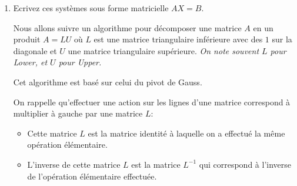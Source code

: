 \begin{enumerate}
    \item Ecrivez ces systèmes sous forme matricielle $A X = B$.


Nous allons suivre un algorithme pour décomposer une matrice $A$ en un produit $A = LU$ où $L$ est une matrice triangulaire inférieure avec des $1$ sur la diagonale et $U$ une matrice triangulaire supérieure.\newline 
\textit{On note souvent $L$ pour Lower, et $U$ pour Upper.}

Cet algorithme est basé sur celui du pivot de Gauss.

    \vspace{1em}
    On rappelle qu'effectuer une action sur les lignes d'une matrice correspond à multiplier à gauche par une matrice $L$: 
    \begin{itemize}
        \item Cette matrice $L$ est la matrice identité à laquelle on a effectué la même opération élémentaire.
        \item L'inverse de cette matrice $L$ est la matrice $L^{-1}$ qui correspond à l'inverse de l'opération élémentaire effectuée.
    \end{itemize}


\end{enumerate}
